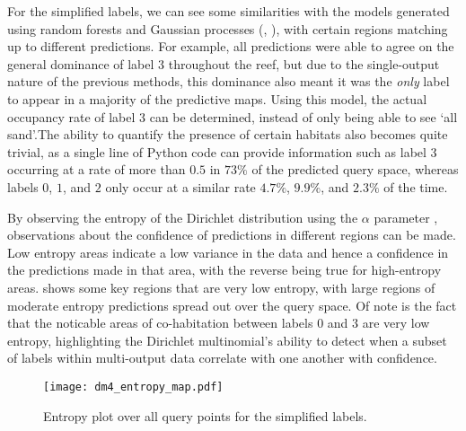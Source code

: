 For the simplified labels, we can see some similarities with the models generated using random forests and Gaussian processes (, ), with certain regions matching up to different predictions. For example, all predictions were able to agree on the general dominance of label 3 throughout the reef, but due to the single-output nature of the previous methods, this dominance also meant it was the \textit{only} label to appear in a majority of the predictive maps. Using this model, the actual occupancy rate of label 3 can be determined, instead of only being able to see `all sand'.The ability to quantify the presence of certain habitats also becomes quite trivial, as a single line of Python code can provide information such as label 3 occurring at a rate of more than $0.5$ in $73\%$ of the predicted query space, whereas labels $0$, $1$, and $2$ only occur at a similar rate $4.7\%$, $9.9\%$, and $2.3\%$ of the time.

By observing the entropy of the Dirichlet distribution using the $\alpha$ parameter , observations about the confidence of predictions in different regions can be made. Low entropy areas indicate a low variance in the data and hence a confidence in the predictions made in that area, with the reverse being true for high-entropy areas.  shows some key regions that are very low entropy, with large regions of moderate entropy predictions spread out over the query space. Of note is the fact that the noticable areas of co-habitation between labels $0$ and $3$ are very low entropy, highlighting the Dirichlet multinomial's ability to detect when a subset of labels within multi-output data correlate with one another with confidence.

\begin{figure}
    \begin{minipage}{\linewidth}
        \centerline{\texttt{[image: dm4\_entropy\_map.pdf]}}
        \caption{Entropy plot over all query points for the simplified labels. }
        \label{fig:dm4_entropy}
    \end{minipage}
    \hfill
\end{figure}

